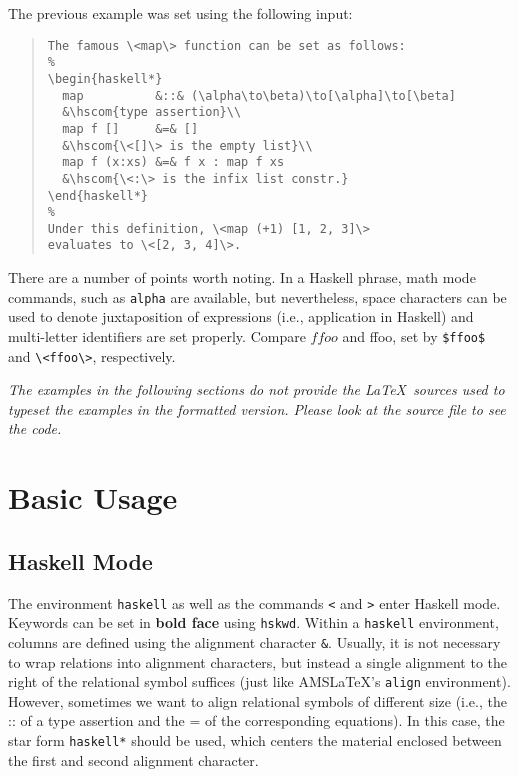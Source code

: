 \documentclass[a4paper]{article}
\newcommand{\cmd}[1]{\texttt{\backslashchar#1}}
\begin{document}
The previous example was set using the following input:
%
\begin{quote}
\begin{verbatim}
The famous \<map\> function can be set as follows:
%
\begin{haskell*}
  map          &::& (\alpha\to\beta)\to[\alpha]\to[\beta]
  &\hscom{type assertion}\\
  map f []     &=& []
  &\hscom{\<[]\> is the empty list}\\
  map f (x:xs) &=& f x : map f xs
  &\hscom{\<:\> is the infix list constr.}
\end{haskell*}
%
Under this definition, \<map (+1) [1, 2, 3]\> 
evaluates to \<[2, 3, 4]\>.
\end{verbatim}
\end{quote}
%
There are a number of points worth noting.  In a Haskell phrase, math mode
commands, such as \cmd{alpha} are available, but nevertheless, space
characters can be used to denote juxtaposition of expressions (i.e.,
application in Haskell) and multi-letter identifiers are set properly.
Compare $ffoo$ and \<ffoo\>, set by \verb|$ffoo$| and \verb|\<ffoo\>|,
respectively.

\textit{The examples in the following sections do not provide the \LaTeX\ 
  sources used to typeset the examples in the formatted version.  Please look
  at the source file to see the code.}

\section{Basic Usage}

\subsection{Haskell Mode}

The environment \texttt{haskell} as well as the commands \cmd< and \cmd> enter
Haskell mode.  Keywords can be set in \textbf{bold face} using \cmd{hskwd}.
Within a \texttt{haskell} environment, columns are defined using the alignment
character \texttt{\&}.  Usually, it is not necessary to wrap relations into
alignment characters, but instead a single alignment to the right of the
relational symbol suffices (just like AMS\LaTeX's \texttt{align}
environment).  However, sometimes we want to align relational symbols of
different size (i.e., the \<::\> of a type assertion and the \<=\> of the
corresponding equations).  In this case, the star form \texttt{haskell*}
should be used, which centers the material enclosed between the first and
second alignment character.
\end{document}
